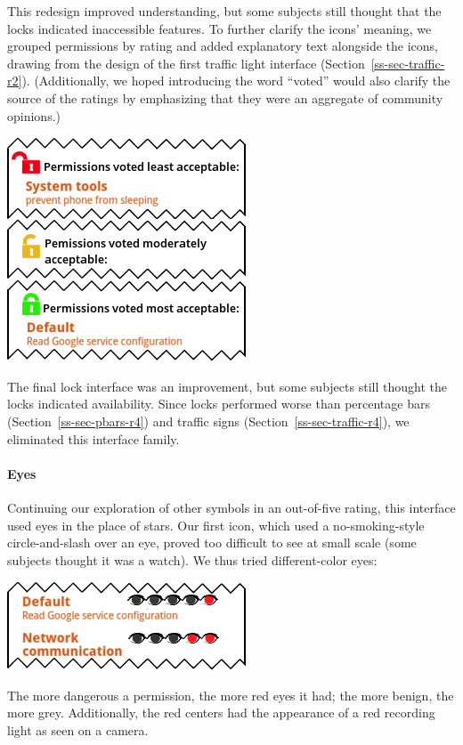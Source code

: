 \documentclass[11pt]{article}
\newcommand{\refsec}[1]{Section~\ref{#1}}
\begin{document}
This redesign improved understanding, but 
some subjects still thought that the locks indicated inaccessible features.
To further clarify the icons' meaning, we grouped 
permissions by rating and added explanatory 
text alongside the icons, drawing 
from the design of the first traffic light interface 
(\refsec{ss-sec-traffic-r2}).
(Additionally, we hoped introducing the word ``voted'' 
would also clarify the source of the ratings by emphasizing that they 
were an aggregate of community opinions.)
\label{ss-sec-locks-r4}
\begin{center}
\includegraphics[width=.5\linewidth]{candidate-img/locks/locksR4.png}
\end{center}
The final lock interface was an improvement, 
but some subjects still thought the locks indicated 
availability. Since locks 
performed worse than percentage bars (\refsec{ss-sec-pbars-r4}) 
and traffic signs (\refsec{ss-sec-traffic-r4}), 
we eliminated this interface family.



\paragraph{Eyes}
\label{s-sec-eyes}

Continuing our exploration of other symbols in an out-of-five rating, this 
interface used eyes in the place of stars. Our first icon, which
used a no-smoking-style circle-and-slash over an eye, 
proved too difficult to see at small scale
(some subjects thought it was a watch). We thus tried different-color eyes:
\label{ss-sec-eyes-r2}
\begin{center}
\includegraphics[width=.5\linewidth]{candidate-img/eyes/eyesR2.png}
\end{center}
The more dangerous a permission, the more red eyes it had; the more
benign, the more grey.
Additionally, the red centers had 
the appearance of a red recording light as seen on a camera.
\end{document}
